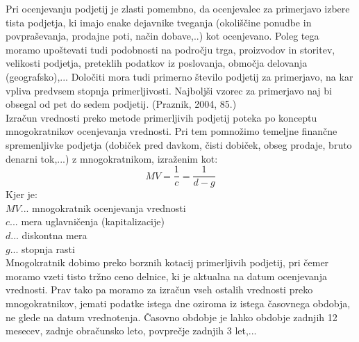 \documentclass[12pt,a4paper]{amsart}
\theoremstyle{definition} %
\theoremstyle{plain} %
\begin{document}
Pri ocenjevanju podjetij je zlasti pomembno, da ocenjevalec za primerjavo izbere tista podjetja, ki imajo enake dejavnike tveganja (okoliščine ponudbe in povpraševanja, prodajne poti, način dobave,..) kot ocenjevano. Poleg tega moramo upoštevati tudi podobnosti na področju trga, proizvodov in storitev, velikosti podjetja, preteklih podatkov iz poslovanja, območja delovanja (geografsko),... Določiti mora tudi primerno število podjetij za primerjavo, na kar vpliva predvsem stopnja primerljivosti. Najboljši vzorec za primerjavo naj bi obsegal od pet do sedem podjetij. (Praznik, 2004, 85.)\\
Izračun vrednosti preko metode primerljivih podjetij poteka po konceptu mnogokratnikov ocenjevanja vrednosti. Pri tem pomnožimo temeljne finančne spremenljivke podjetja (dobiček pred davkom, čisti dobiček, obseg prodaje, bruto denarni tok,...) z mnogokratnikom, izraženim kot:
\begin{equation}
MV=\frac{1}{c}=\frac{1}{d-g}
\end{equation}
Kjer je:\\
$MV$... mnogokratnik ocenjevanja vrednosti\\
$c$... mera uglavničenja (kapitalizacije)\\
$d$... diskontna mera\\
$g$... stopnja rasti\\
Mnogokratnik dobimo preko borznih kotacij primerljivih podjetij, pri čemer moramo vzeti tisto tržno ceno delnice, ki je aktualna na datum ocenjevanja vrednosti. Prav tako  pa moramo za izračun vseh ostalih vrednosti preko mnogokratnikov, jemati podatke istega dne oziroma iz istega časovnega obdobja, ne glede na datum vrednotenja. Časovno obdobje je lahko obdobje zadnjih 12 mesecev, zadnje obračunsko leto, povprečje zadnjih 3 let,...\par
\end{document}
